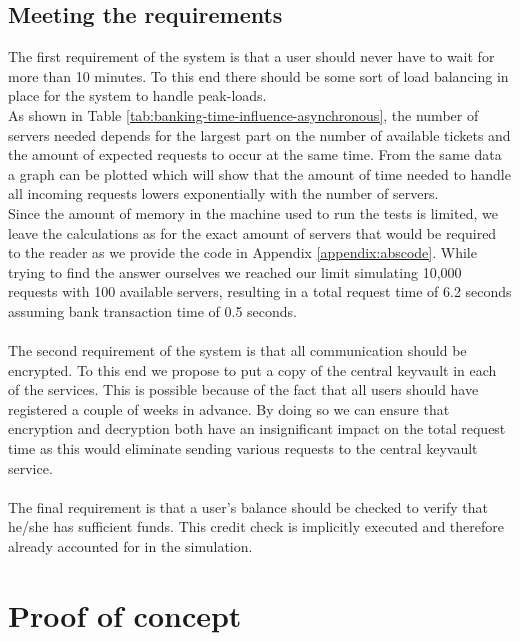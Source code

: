 \documentclass[10pt,a4paper,twocolumn]{article}
\begin{document}
\subsection{Meeting the requirements}
The first requirement of the system is that a user should never have to wait for more than 10 minutes. To this end there should be some sort of load balancing in place for the system to handle peak-loads.\\
As shown in Table \ref{tab:banking-time-influence-asynchronous}, the number of servers needed depends for the largest part on the number of available tickets and the amount of expected requests to occur at the same time. From the same data a graph can be plotted which will show that the amount of time needed to handle all incoming requests lowers exponentially with the number of servers. \\
Since the amount of memory in the machine used to run the tests is limited, we leave the calculations as for the exact amount of servers that would be required to the reader as we provide the code in Appendix \ref{appendix:abscode}. While trying to find the answer ourselves we reached our limit simulating 10,000 requests with 100 available servers, resulting in a total request time of 6.2 seconds assuming bank transaction time of 0.5 seconds.\\
\\
The second requirement of the system is that all communication should be encrypted. To this end we propose to put a copy of the central keyvault in each of the services. This is possible because of the fact that all users should have registered a couple of weeks in advance. By doing so we can ensure that encryption and decryption both have an insignificant impact on the total request time as this would eliminate sending various requests to the central keyvault service.\\
\\
The final requirement is that a user's balance should be checked to verify that he/she has sufficient funds. This credit check is implicitly executed and therefore already accounted for in the simulation. 

\section{Proof of concept}
\end{document}
